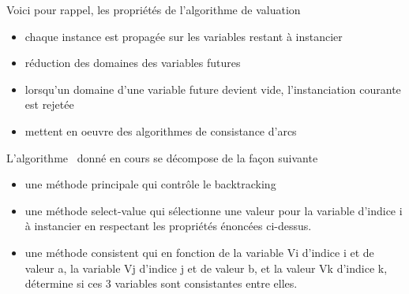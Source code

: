 Voici pour rappel, les propriétés de l'algorithme de valuation \fla
\begin{itemize}
\item chaque instance est propagée sur les variables restant à instancier
\item réduction des domaines des variables futures
\item lorsqu’un domaine d’une variable future devient vide, l’instanciation courante est rejetée
\item mettent en oeuvre des algorithmes de consistance d’arcs
\end{itemize}
L'algorithme \fla\ donné en cours se décompose de la façon suivante
\begin{itemize}
\item une méthode principale qui contrôle le backtracking
\item une méthode select-value qui sélectionne une valeur pour la variable d'indice i à instancier en respectant les propriétés énoncées ci-dessus.
\item une méthode consistent qui en fonction de la variable Vi d'indice i et de valeur a, la variable Vj d'indice j et de valeur b, et la valeur Vk d'indice k, détermine si ces 3 variables sont consistantes entre elles.
\end{itemize}

